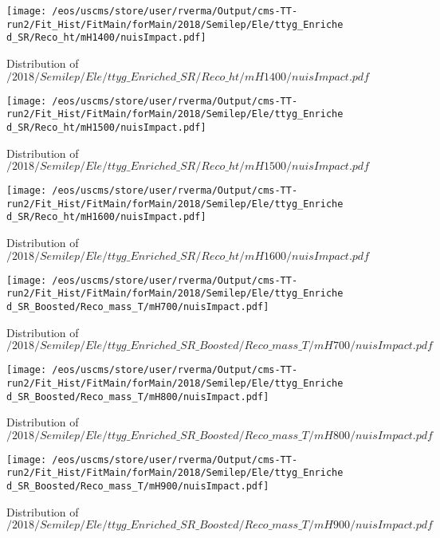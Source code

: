 \begin{figure}
\centering
\texttt{[image: /eos/uscms/store/user/rverma/Output/cms-TT-run2/Fit\_Hist/FitMain/forMain/2018/Semilep/Ele/ttyg\_Enriched\_SR/Reco\_ht/mH1400/nuisImpact.pdf]}
\caption{Distribution of $/2018/Semilep/Ele/ttyg\_Enriched\_SR/Reco\_ht/mH1400/nuisImpact.pdf$}
\end{figure}

\begin{figure}
\centering
\texttt{[image: /eos/uscms/store/user/rverma/Output/cms-TT-run2/Fit\_Hist/FitMain/forMain/2018/Semilep/Ele/ttyg\_Enriched\_SR/Reco\_ht/mH1500/nuisImpact.pdf]}
\caption{Distribution of $/2018/Semilep/Ele/ttyg\_Enriched\_SR/Reco\_ht/mH1500/nuisImpact.pdf$}
\end{figure}

\begin{figure}
\centering
\texttt{[image: /eos/uscms/store/user/rverma/Output/cms-TT-run2/Fit\_Hist/FitMain/forMain/2018/Semilep/Ele/ttyg\_Enriched\_SR/Reco\_ht/mH1600/nuisImpact.pdf]}
\caption{Distribution of $/2018/Semilep/Ele/ttyg\_Enriched\_SR/Reco\_ht/mH1600/nuisImpact.pdf$}
\end{figure}

\begin{figure}
\centering
\texttt{[image: /eos/uscms/store/user/rverma/Output/cms-TT-run2/Fit\_Hist/FitMain/forMain/2018/Semilep/Ele/ttyg\_Enriched\_SR\_Boosted/Reco\_mass\_T/mH700/nuisImpact.pdf]}
\caption{Distribution of $/2018/Semilep/Ele/ttyg\_Enriched\_SR\_Boosted/Reco\_mass\_T/mH700/nuisImpact.pdf$}
\end{figure}

\begin{figure}
\centering
\texttt{[image: /eos/uscms/store/user/rverma/Output/cms-TT-run2/Fit\_Hist/FitMain/forMain/2018/Semilep/Ele/ttyg\_Enriched\_SR\_Boosted/Reco\_mass\_T/mH800/nuisImpact.pdf]}
\caption{Distribution of $/2018/Semilep/Ele/ttyg\_Enriched\_SR\_Boosted/Reco\_mass\_T/mH800/nuisImpact.pdf$}
\end{figure}

\begin{figure}
\centering
\texttt{[image: /eos/uscms/store/user/rverma/Output/cms-TT-run2/Fit\_Hist/FitMain/forMain/2018/Semilep/Ele/ttyg\_Enriched\_SR\_Boosted/Reco\_mass\_T/mH900/nuisImpact.pdf]}
\caption{Distribution of $/2018/Semilep/Ele/ttyg\_Enriched\_SR\_Boosted/Reco\_mass\_T/mH900/nuisImpact.pdf$}
\end{figure}

